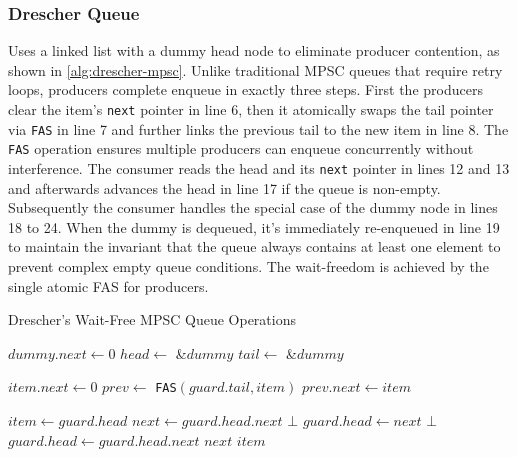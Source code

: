 \subsubsection{Drescher Queue}\label{subsubsec:drescher-mpsc-queue}
Uses a linked list with a dummy head node to eliminate producer contention, as shown in \cref{alg:drescher-mpsc}. Unlike traditional \ac{MPSC} queues that require retry loops, producers complete enqueue in exactly three steps. First the producers clear the item's \texttt{next} pointer in line 6, then it atomically swaps the tail pointer via \texttt{\ac{FAS}} in line 7 and further links the previous tail to the new item in line 8. The \texttt{\ac{FAS}} operation ensures multiple producers can enqueue concurrently without interference. The consumer reads the head and its \texttt{next} pointer in lines 12 and 13 and afterwards advances the head in line 17 if the queue is non-empty. Subsequently the consumer handles the special case of the dummy node in lines 18 to 24. When the dummy is dequeued, it's immediately re-enqueued in line 19 to maintain the invariant that the queue always contains at least one element to prevent complex empty queue conditions. The wait-freedom is achieved by the single atomic \ac{FAS} for producers. \cite{Drescher2015GuardedSections}

\begin{algorithm}[!ht]
    \centering
    \captionsetup{justification=centering}
    \caption{Drescher's Wait-Free \ac{MPSC} Queue Operations}
    \label{alg:drescher-mpsc}
    \scriptsize
    \begin{algorithmic}[1]
        \State $dummy.next \gets 0$
        \State $head \gets$ \&$dummy$
        \State $tail \gets$ \&$dummy$
        
        \State
        
            \State $item.next \gets 0$ 
            \State $prev \gets$ \texttt{FAS}$(guard.tail, item)$ 
            \State $prev.next \gets item$ 
        \EndProcedure
        
        \State
        
            \State $item \gets guard.head$
            \State $next \gets guard.head.next$
             
                \State \Return $\bot$
            \EndIf
            \State $guard.head \gets next$
             
                \State {} 
                 
                    \State \Return $\bot$
                \EndIf
                \State $guard.head \gets guard.head.next$
                \State \Return $next$
            \EndIf
            \State \Return $item$
        \EndFunction
    \end{algorithmic}
\end{algorithm}

